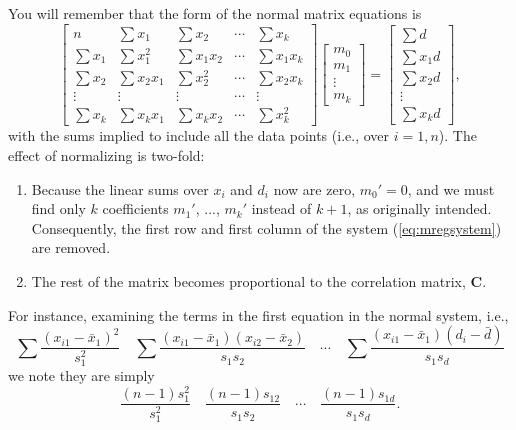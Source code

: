 You will remember that the form of the normal matrix equations is
\begin{equation}
\left [ \begin{array}{ccccc}
n &  \sum x_1 &  \sum x_2 & \cdots &  \sum x_k \\[5pt]
 \sum x_1 &  \sum x^2_1 & \sum x_1 x_2 & \cdots &  \sum x_1 x_k \\[5pt]
 \sum x_2 &  \sum x_2 x_1 & \sum x^2_2 & \cdots &  \sum x_2 x_k \\[5pt]
\vdots & \vdots & \vdots & \cdots & \vdots \\[5pt]
 \sum x_k &  \sum x_k x_1  & \sum x_k x_2 & \cdots &  \sum x^2_k 
\end{array} \right ] 
\left [ \begin{array}{c}
m_0\\ m_1\\ \vdots \\ m_k \end{array} \right ]  = 
\left [
\begin{array}{c}
 \sum d \\[5pt]  \sum x_1 d \\[5pt]  \sum x_2 d \\[5pt] \vdots \\[5pt] \sum x_k d
\end{array} \right ] ,
\label{eq:mregsystem}
\end{equation}
with the sums implied to include all the data points (i.e., over $i = 1,n$).
The effect of normalizing is two-fold:
\begin{enumerate}
\item	Because the linear sums over $x_i$ and $d_i$ now are zero, $m_0' = 0$, and we must find only $k$ coefficients $m_1'$, ..., $m_k'$ instead of $k + 1$, as originally 
intended.  Consequently, the first row and first column of the system (\ref{eq:mregsystem}) are removed.
\item	The rest of the matrix becomes proportional to the correlation matrix, $\mathbf{C}$.
\end{enumerate}
For instance, examining the terms in the first equation in the normal system, i.e.,
\begin{equation}
\sum \frac{(x_{i1} - \bar{x}_1) ^2}{s^2_1} \quad \sum \frac{(x_{i1} - \bar{x}_1) (x_{i2} - \bar{x}_2)}{s_1s_2} \quad \cdots \quad \sum 
\frac{(x_{i1} - \bar{x}_1)(d_i - \bar{d})}{s_1s_d}
\end{equation}	 
we note they are simply
\begin{equation}
\frac{(n-1)s^2_1}{s^2_1}  \quad \frac{(n-1)s_{12}}{s_1 s_2} \quad \cdots \quad \frac{(n-1)s_{1d}}{s_1 s_d}.
\end{equation}	 
